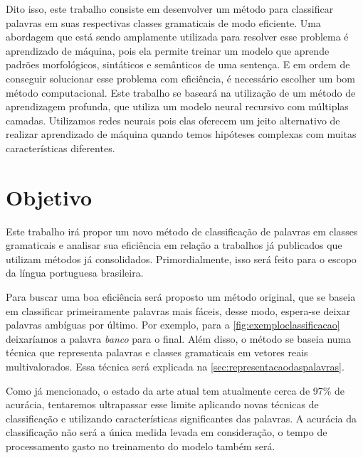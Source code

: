 Dito isso, este trabalho consiste em desenvolver um método para classificar palavras em suas respectivas classes gramaticais de modo eficiente. Uma abordagem que está sendo amplamente utilizada para resolver esse problema é aprendizado de máquina, pois ela permite treinar um modelo que aprende padrões morfológicos, sintáticos e semânticos de uma sentença. E em ordem de conseguir solucionar esse problema com eficiência, é necessário escolher um bom método computacional. Este trabalho se baseará na utilização de um método de aprendizagem profunda, que utiliza um modelo neural recursivo com múltiplas camadas. Utilizamos redes neurais pois elas oferecem um jeito alternativo de realizar aprendizado de máquina quando temos hipóteses complexas com muitas características diferentes. 


\section{Objetivo}\label{sec:objetivo}

Este trabalho irá propor um novo método de classificação de palavras em classes gramaticais e analisar sua eficiência em relação a trabalhos já publicados que utilizam métodos já consolidados. Primordialmente, isso será feito para o escopo da língua portuguesa brasileira. 

Para buscar uma boa eficiência será proposto um método original, que se baseia em classificar primeiramente palavras mais fáceis, desse modo, espera-se deixar palavras ambíguas por último. Por exemplo, para a \autoref{fig:exemploclassificacao} deixaríamos a palavra \textit{banco} para o final. Além disso, o método se baseia numa técnica que  representa palavras e classes gramaticais em vetores reais multivalorados. Essa técnica será explicada na \autoref{sec:representacaodaspalavras}. 

Como já mencionado, o estado da arte atual tem atualmente cerca de 97\% de acurácia, tentaremos ultrapassar esse limite aplicando novas técnicas de classificação e utilizando características significantes das palavras. A acurácia da classificação não será a única medida levada em consideração, o tempo de processamento gasto no treinamento do modelo também será.



